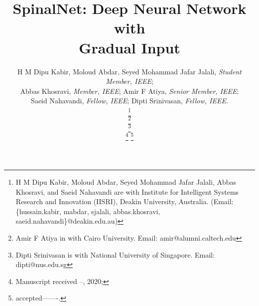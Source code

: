 \documentclass[journal]{IEEEtran}
\begin{document}
\title{SpinalNet: Deep Neural Network with \\Gradual Input}
\author{H M Dipu Kabir, Moloud Abdar, Seyed Mohammad Jafar Jalali, \emph{Student Member, IEEE};\\ Abbas Khosravi, \emph{Member, IEEE}; Amir F Atiya, \emph{Senior Member, IEEE};\\ Saeid Nahavandi, \emph{Fellow, IEEE};  Dipti Srinivasan, \emph{Fellow, IEEE}.

\thanks{H M Dipu Kabir, Moloud Abdar, Seyed Mohammad Jafar Jalali, Abbas Khosravi, and Saeid Nahavandi are with Institute for Intelligent Systems Research and Innovation (IISRI), Deakin University, Australia. (Email: \{hussain.kabir, mabdar, sjalali, abbas.khosravi, saeid.nahavandi\}@deakin.edu.au)}

\thanks{Amir F Atiya in with Cairo University. Email: amir@alumni.caltech.edu}

\thanks{Dipti Srinivasan is with National University of Singapore. Email: dipti@nus.edu.sg}


\thanks{Manuscript received  --, 2020;}
\thanks{accepted-------.}
}













\maketitle
\end{document}
